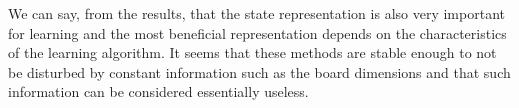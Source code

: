 \documentclass[result.tex]{subfiles}
\begin{document}
    We can say, from the results, that the state representation is also very important for learning and the most beneficial representation depends on the characteristics of the learning algorithm. It seems that these methods are stable enough to not be disturbed by constant information such as the board dimensions and that such information can be considered essentially useless.
\end{document}

